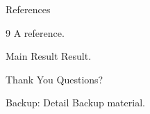 \documentclass{beamer}
\begin{document}
\begin{frame}{References}
  \begin{thebibliography}{9}
     A reference.
  \end{thebibliography}
\end{frame}
\begin{frame}{Main Result}
  Result.
\end{frame}
\begin{frame}{Thank You}
  Questions?
\end{frame}
\appendix
\begin{frame}{Backup: Detail}
  Backup material.
\end{frame}
\end{document}
